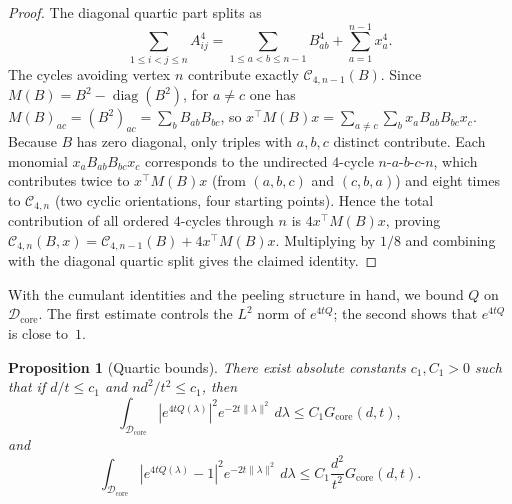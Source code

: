 \documentclass[11pt]{article}
\newtheorem{proposition}[theorem]{Proposition}
\theoremstyle{definition}
\newcommand{\corereg}{\mathcal{D}_\mathrm{core}}
\newcommand{\diag}{\operatorname{diag}}
\newcommand{\core}{G_{\mathrm{core}}}
\begin{document}
\begin{proof}
The diagonal quartic part splits as
\[
  \sum_{1\le i<j\le n}A_{ij}^4
  =
  \sum_{1\le a<b\le n-1}B_{ab}^4+\sum_{a=1}^{n-1}x_a^4.
\]
The cycles avoiding vertex \(n\) contribute exactly \(\mathcal{C}_{4,n-1}(B)\). Since \(M(B)=B^2-\diag(B^2)\), for \(a\ne c\) one has \(M(B)_{ac}=(B^2)_{ac}=\sum_{b}B_{ab}B_{bc}\), so \(x^\top M(B)x=\sum_{a\ne c}\sum_{b}x_aB_{ab}B_{bc}x_c\).
Because \(B\) has zero diagonal, only triples with \(a,b,c\) distinct contribute. Each monomial \(x_aB_{ab}B_{bc}x_c\) corresponds to the undirected \(4\)-cycle \(n\text{-}a\text{-}b\text{-}c\text{-}n\), which contributes twice to \(x^\top M(B)x\) (from \((a,b,c)\) and \((c,b,a)\)) and eight times to \(\mathcal{C}_{4,n}\) (two cyclic orientations, four starting points). Hence the total contribution of all ordered \(4\)-cycles through \(n\) is \(4x^\top M(B)x\), proving \(\mathcal{C}_{4,n}(B,x)=\mathcal{C}_{4,n-1}(B)+4x^\top M(B)x\).
Multiplying by \(1/8\) and combining with the diagonal quartic split gives the claimed identity.
\end{proof}

With the cumulant identities and the peeling structure in hand, we bound \(Q\) on \(\corereg\). The first estimate controls the \(L^2\) norm of \(e^{4tQ}\); the second shows that \(e^{4tQ}\) is close to~\(1\).

\begin{proposition}[Quartic bounds]\label{prop:quartic-bounds}
There exist absolute constants \(c_1,C_1>0\) such that if
\(d/t\le c_1\) and \(nd^2/t^2\le c_1\), then
\[
  \int_{\corereg}|e^{4tQ(\lambda)}|^2e^{-2t\|\lambda\|^2}\,d\lambda
  \le C_1\core(d,t),
\]
and
\[
  \int_{\corereg}|e^{4tQ(\lambda)}-1|^2e^{-2t\|\lambda\|^2}\,d\lambda
  \le C_1\frac{d^2}{t^2}\core(d,t).
\]
\end{proposition}
\end{document}
